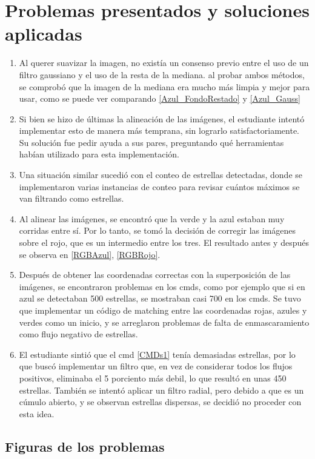 \documentclass[10pt,twocolumn]{article}
\begin{document}
\section{Problemas presentados y soluciones aplicadas}

\begin{enumerate}
  \item Al querer suavizar la imagen, no existía un consenso previo entre el uso de un filtro gaussiano y el uso de la resta de la mediana. al probar ambos métodos, 
  se comprobó que la imagen de la mediana era mucho más limpia y mejor para usar, como se puede ver comparando \ref{Azul_FondoRestado} y \ref{Azul_Gauss}
  \item Si bien se hizo de últimas la alineación de las imágenes, el estudiante intentó implementar esto de manera más temprana, sin lograrlo satisfactoriamente. 
  Su solución fue pedir ayuda a sus pares, preguntando qué herramientas habían utilizado para esta implementación.
  \item Una situación similar sucedió con el conteo de estrellas detectadas, donde se implementaron varias instancias de conteo para revisar cuántos máximos se van filtrando como estrellas.
  \item Al alinear las imágenes, se encontró que la verde y la azul estaban muy corridas entre sí. Por lo tanto, se tomó la decisión de corregir las imágenes sobre el rojo, 
  que es un intermedio entre los tres. El resultado antes y después se observa en \ref{RGBAzul}, \ref{RGBRojo}.
  \item Después de obtener las coordenadas correctas con la superposición de las imágenes, se encontraron problemas en los cmds, como por ejemplo que si en azul se detectaban 500 estrellas, 
  se mostraban casi 700 en los cmds. Se tuvo que implementar un código de matching entre las coordenadas rojas, azules y verdes como un inicio, y se arreglaron problemas de falta de enmascaramiento como flujo negativo de estrellas.
  \item El estudiante sintió que el cmd \ref{CMDs1} tenía demasiadas estrellas, por lo que buscó implementar un filtro que, 
  en vez de considerar todos los flujos positivos, eliminaba el 5 porciento más debil, lo que resultó en unas 450 estrellas.
   También se intentó aplicar un filtro radial, pero debido a que es un cúmulo abierto, y se observan estrellas dispersas, se decidió no proceder con esta idea. 
\end{enumerate}

\subsection{Figuras de los problemas}
\end{document}
